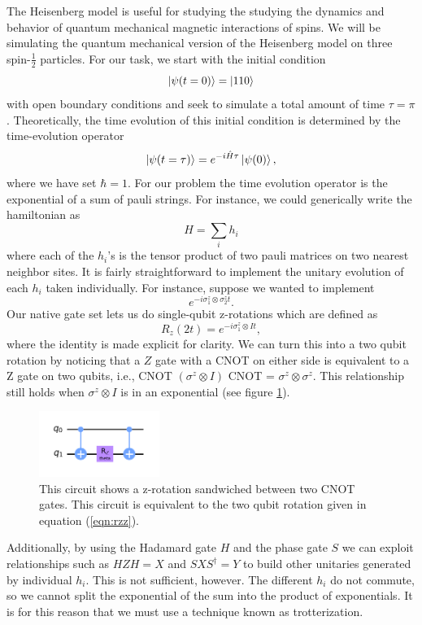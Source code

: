 \documentclass[aps,prl, reprint]{revtex4-2}
\begin{document}
The Heisenberg model is useful for studying the studying the dynamics and behavior of quantum mechanical magnetic interactions of spins. We will be simulating the quantum mechanical version of the Heisenberg model on three spin-$\frac{1}{2}$ particles. For our task, we start with the initial condition
\begin{equation}
\ket{\psi(t=0)} = \ket{110}
\end{equation}
with open boundary conditions and seek to simulate a total amount of time $\tau = \pi$. Theoretically, the time evolution of this initial condition is determined by the time-evolution operator
\begin{equation}
\ket{\psi(t=\tau)} = e^{-i \hat{H} \tau}\ket{\psi(0)},
\end{equation}
where we have set $\hbar = 1$. For our problem the time evolution operator is the exponential of a sum of pauli strings. For instance, we could generically write the hamiltonian as
\begin{equation}
H = \sum_i h_i
\end{equation}
where each of the $h_i$'s is the tensor product of two pauli matrices on two nearest neighbor sites. It is fairly straightforward to implement the unitary evolution of each $h_i$ taken individually. For instance, suppose we wanted to implement
\begin{equation}
e^{-i \sigma^{z}_1 \otimes \sigma^{z}_2 t}.
\label{eqn:rzz}
\end{equation}
Our native gate set lets us do single-qubit z-rotations which are defined as
\begin{equation}
R_{z}(2t)=e^{-i \sigma^{z}_1 \otimes I t },
\end{equation}
where the identity is made explicit for clarity. We can turn this into a two qubit rotation by noticing that a $Z$ gate with a CNOT on either side is equivalent to a Z gate on two qubits, i.e., CNOT $(\sigma^{z} \otimes I)$ CNOT = $\sigma^{z} \otimes \sigma^{z}$. This relationship still holds when $\sigma^{z} \otimes I$ is in an exponential (see figure \ref{fig:rzz}). 
\begin{figure}[t]
\includegraphics[width=0.35\textwidth]{Rzz.png}
\caption{This circuit shows a z-rotation sandwiched between two CNOT gates. This circuit is equivalent to the two qubit rotation given in equation (\ref{eqn:rzz}).}
\label{fig:rzz}
\end{figure}
Additionally, by using the Hadamard gate $H$ and the phase gate $S$ we can exploit relationships such as $HZH = X$ and $S X S^{\dagger}=Y$ to build other unitaries generated by individual $h_i$. This is not sufficient, however. The different $h_i$ do not commute, so we cannot split the exponential of the sum into the product of exponentials. It is for this reason that we must use a technique known as trotterization.
\end{document}
